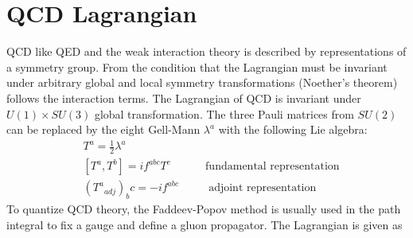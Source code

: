 %
%


\pagebreak
\section{QCD Lagrangian}
\label{QCD Lagrangian}

QCD like QED and the weak interaction theory is described by representations of a symmetry group. From the condition that the Lagrangian must be invariant under arbitrary global and local symmetry transformations (Noether’s theorem) follows the interaction terms.
The Lagrangian of QCD is invariant under $ U(1) \times SU(3) $ global transformation. The three Pauli matrices from $ SU(2) $ can be replaced by the eight Gell-Mann $ \lambda^a $ with the following Lie algebra: 
\begin{equation}
\begin{split}
&T^a = \frac{1}{2} \lambda^a\\
&[T^a, T^b]= if^{abc} T^c \:\:\:\:\:\:\:\:\:\:\:\:\:\:\text{fundamental representation}\\
&({T^a}_{adj})_bc = -if^{abc} \:\:\:\:\:\:\:\:\:\:\:\:\text{adjoint representation}
\end{split}
\end{equation}
To quantize QCD theory, the Faddeev-Popov method \cite{Faddeev:1967fc} is usually used in the path integral to fix a gauge and define a gluon propagator. The Lagrangian is given as

